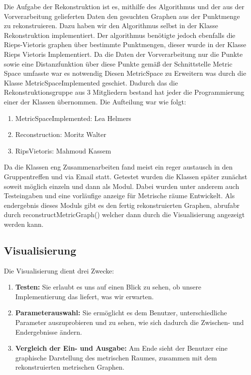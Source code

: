 \documentclass[parskip=half,
 fontsize=12pt, bibtotoc,
 ngerman]
 {article}
\begin{document}
Die Aufgabe der Rekonstruktion ist es, mithilfe des Algorithmus und der aus der Vorverarbeitung gelieferten Daten den gesuchten Graphen aus der Punktmenge zu rekonstruieren. Dazu haben wir den Algorithmus selbst in der Klasse Rekonstruktion implementiert. Der algorithmus benötigte jedoch ebenfalls die Rieps-Vietoris graphen über bestimmte Punktmengen, dieser wurde in der Klasse Rieps Vietoris Implementiert. Da die Daten der Vorverarbeitung nur die Punkte sowie eine Distanzfunktion  über diese Punkte gemäß der Schnittstelle Metric Space umfasste war es notwendig Diesen MetricSpace zu Erweitern was durch die Klasse MetricSpaceImplemented geschiet. Dadurch das die Rekonstruktionsgruppe aus 3 Mitgliedern bestand hat jeder die Programmierung einer der Klassen übernommen. Die Aufteilung war wie folgt:

\begin{enumerate}
\item MetricSpaceImplemented: Lea Helmers
\item Reconstruction: Moritz Walter
\item RipsVietoris: Mahmoud Kassem
\end{enumerate}

Da die Klassen eng Zusammenarbeiten fand meist ein reger austausch in den Gruppentreffen und via Email statt. Getestet wurden die Klassen später zunächst soweit möglich einzeln und dann als Modul. Dabei wurden unter anderem auch Testeingaben und eine vorläufige anzeige für Metrische räume Entwickelt. Als endergebnis dieses Moduls gibt es den fertig rekonstruierten Graphen, abrufabr durch reconstructMetricGraph() welcher dann durch die Visualisierung angezeigt werden kann.

\subsection{Visualisierung}

Die Visualisierung dient drei Zwecke:

\begin{enumerate}
\item \textbf{Testen:} Sie erlaubt es uns auf einen Blick zu sehen, ob unsere Implementierung das liefert, was wir erwarten.
\item \textbf{Parameterauswahl:} Sie ermöglicht es dem Benutzer, unterschiedliche Parameter auszuprobieren und zu sehen, wie sich dadurch die Zwischen- und Endergebnisse ändern.
\item \textbf{Vergleich der Ein- und Ausgabe:} Am Ende sieht der Benutzer eine graphische Darstellung des metrischen Raumes, zusammen mit dem rekonstruierten metrischen Graphen.
\end{enumerate}
\end{document}
